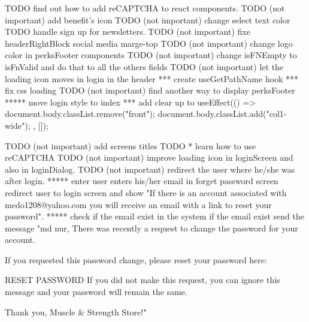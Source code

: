 TODO find out how to add reCAPTCHA to react components.
TODO (not important) add benefit's icon
TODO (not important) change select text color
TODO handle sign up for newsletters.
TODO (not important) fixe headerRightBlock social media marge-top 
TODO (not important) change logo color in perksFooter  components
TODO (not important) change isFNEmpty to isFnValid and do that to all the others fields
TODO (not important) let the loading icon moves in login in the header
*** create useGetPathName hook
 *** fix css loading 
TODO (not important)  find another way to display perksFooter
 ***** move login style to index
 *** add clear up to useEffect(() => {
    document.body.classList.remove("front");
    document.body.classList.add("col1-wide");
  }, []);

TODO (not important) add screens titles
TODO * learn how to use reCAPTCHA
TODO (not important) improve loading icon in loginScreen and also in loginDialog.
TODO (not important) redirect the user where he/she was after login.
 ***** enter user enters his/her email in forget password screen redirect user to login screen and show 
  "If there is an account associated with medo1208@yahoo.com you will receive an email with a link to 
  reset your password".
 ***** check if the email exist in the system if the email exist send the message 
  "md nur,
  There was recently a request to change the password for your account.

  If you requested this password change, please reset your password here:

  RESET PASSWORD
  If you did not make this request, you can ignore this message and your password will remain the same.

  Thank you, Muscle & Strength Store!"

